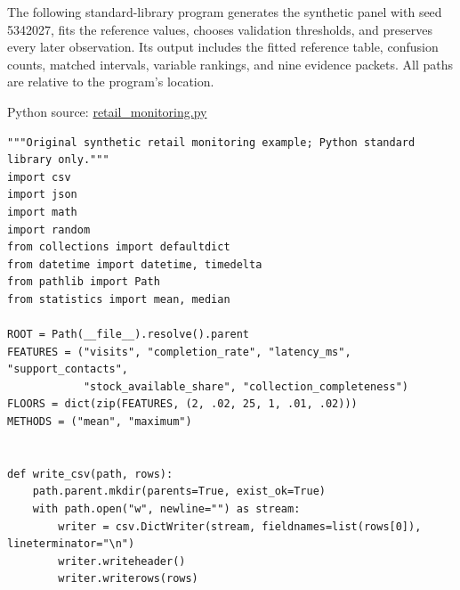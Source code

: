 \noindent \noindent The following standard-library program generates the synthetic
panel with seed 5342027, fits the reference values, chooses validation
thresholds, and preserves every later observation. Its output includes
the fitted reference table, confusion counts, matched intervals,
variable rankings, and nine evidence packets. All paths are relative to
the program's location.

\FloatBarrier
{}
Python source:
\href{../03_Data_and_Code/Anomaly_Diagnosis/retail_monitoring.py}{retail\_monitoring.py}

\begin{Verbatim}[breaklines,breakanywhere,fontsize=\small]
"""Original synthetic retail monitoring example; Python standard library only."""
import csv
import json
import math
import random
from collections import defaultdict
from datetime import datetime, timedelta
from pathlib import Path
from statistics import mean, median

ROOT = Path(__file__).resolve().parent
FEATURES = ("visits", "completion_rate", "latency_ms", "support_contacts",
            "stock_available_share", "collection_completeness")
FLOORS = dict(zip(FEATURES, (2, .02, 25, 1, .01, .02)))
METHODS = ("mean", "maximum")


def write_csv(path, rows):
    path.parent.mkdir(parents=True, exist_ok=True)
    with path.open("w", newline="") as stream:
        writer = csv.DictWriter(stream, fieldnames=list(rows[0]), lineterminator="\n")
        writer.writeheader()
        writer.writerows(rows)



\end{Verbatim}
